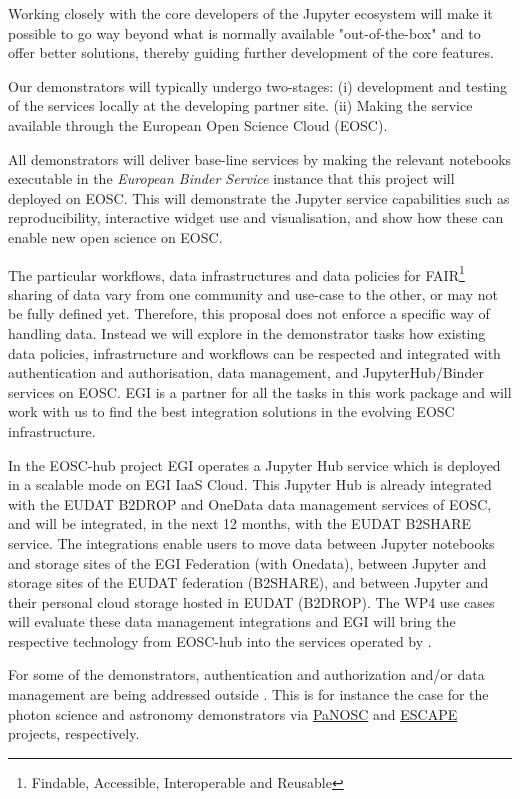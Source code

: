 \begin{workpackage}
\begin{wpdescription}
  Working closely with the core developers of the Jupyter ecosystem will make it possible to
  go way beyond what is normally available "out-of-the-box" and to offer better solutions,
  thereby guiding further development of the core features.

  \medskip
  Our demonstrators will typically undergo two-stages: (i)
  development and testing of the services locally at the developing partner
  site. (ii) Making the service available through the European Open
  Science Cloud (EOSC).

  All demonstrators will deliver base-line services by making the
  relevant notebooks executable in the \emph{European Binder Service} instance that this
  project will deployed on EOSC. This will demonstrate
  the Jupyter service capabilities such as reproducibility, interactive
  widget use and visualisation, and show how these can
  enable new open science on EOSC.

  The particular workflows, data infrastructures and data policies for
  FAIR\footnote{Findable, Accessible, Interoperable and Reusable} sharing of data vary from one community and use-case to
  the other, or may not be fully defined yet. Therefore, this proposal
  does not enforce a specific way of handling data. Instead we
  will explore in the demonstrator tasks how existing data policies,
  infrastructure and workflows can be respected and integrated with
  authentication and authorisation, data management, and
  JupyterHub/Binder services on EOSC. EGI is a partner
  for all the tasks in this work package and will work with us to find the
  best integration solutions in the evolving EOSC
  infrastructure.

  In the EOSC-hub project EGI operates a Jupyter Hub service which is deployed 
  in a scalable mode on EGI IaaS Cloud. This Jupyter Hub is already integrated 
  with the EUDAT B2DROP and OneData data management services of EOSC, and will 
  be integrated, in the next 12 months, with the EUDAT B2SHARE service.
  The integrations enable users to move data between Jupyter notebooks and storage 
  sites of the EGI Federation (with Onedata), between Jupyter and storage sites 
  of the EUDAT federation (B2SHARE), and between Jupyter and their personal cloud 
  storage hosted in EUDAT (B2DROP). The WP4 use cases will evaluate these data management 
  integrations and EGI will bring the respective technology from EOSC-hub into the 
  services operated by \TheProject.

  For some of the demonstrators, authentication and authorization and/or
  data management are being addressed outside \TheProject.
  This is for instance the case for the photon science and astronomy
  demonstrators via \href{https://panosc-eu.github.io/}{PaNOSC} and
  \href{https://www.eso.org/public/announcements/ann18084/}{ESCAPE} projects, respectively.


\end{wpdescription}
\end{workpackage}
